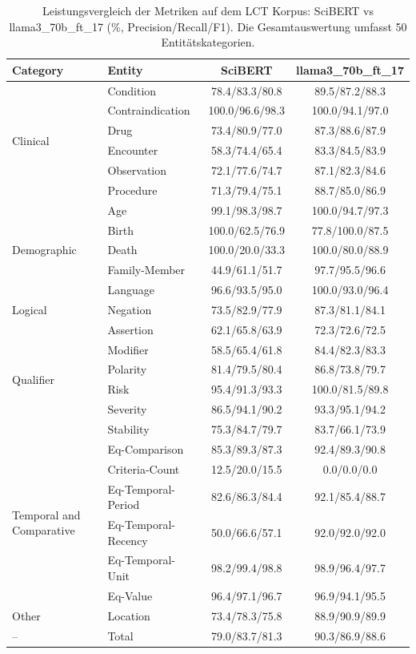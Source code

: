 
\begin{table}[htbp]
\centering
\begin{tabular}{llcc}
\toprule
\textbf{Category} & \textbf{Entity} & \textbf{SciBERT} & \textbf{llama3_70b_ft_17} \\
\midrule
\multirow{6}{*}{Clinical} & Condition & 78.4/83.3/80.8 & 89.5/87.2/88.3 \\
 & Contraindication & 100.0/96.6/98.3 & 100.0/94.1/97.0 \\
 & Drug & 73.4/80.9/77.0 & 87.3/88.6/87.9 \\
 & Encounter & 58.3/74.4/65.4 & 83.3/84.5/83.9 \\
 & Observation & 72.1/77.6/74.7 & 87.1/82.3/84.6 \\
 & Procedure & 71.3/79.4/75.1 & 88.7/85.0/86.9 \\
\midrule
\multirow{5}{*}{Demographic} & Age & 99.1/98.3/98.7 & 100.0/94.7/97.3 \\
 & Birth & 100.0/62.5/76.9 & 77.8/100.0/87.5 \\
 & Death & 100.0/20.0/33.3 & 100.0/80.0/88.9 \\
 & Family-Member & 44.9/61.1/51.7 & 97.7/95.5/96.6 \\
 & Language & 96.6/93.5/95.0 & 100.0/93.0/96.4 \\
\midrule
Logical & Negation & 73.5/82.9/77.9 & 87.3/81.1/84.1 \\
\midrule
\multirow{6}{*}{Qualifier} & Assertion & 62.1/65.8/63.9 & 72.3/72.6/72.5 \\
 & Modifier & 58.5/65.4/61.8 & 84.4/82.3/83.3 \\
 & Polarity & 81.4/79.5/80.4 & 86.8/73.8/79.7 \\
 & Risk & 95.4/91.3/93.3 & 100.0/81.5/89.8 \\
 & Severity & 86.5/94.1/90.2 & 93.3/95.1/94.2 \\
 & Stability & 75.3/84.7/79.7 & 83.7/66.1/73.9 \\
\midrule
\multirow{6}{*}{Temporal and Comparative} & Eq-Comparison & 85.3/89.3/87.3 & 92.4/89.3/90.8 \\
 & Criteria-Count & 12.5/20.0/15.5 & 0.0/0.0/0.0 \\
 & Eq-Temporal-Period & 82.6/86.3/84.4 & 92.1/85.4/88.7 \\
 & Eq-Temporal-Recency & 50.0/66.6/57.1 & 92.0/92.0/92.0 \\
 & Eq-Temporal-Unit & 98.2/99.4/98.8 & 98.9/96.4/97.7 \\
 & Eq-Value & 96.4/97.1/96.7 & 96.9/94.1/95.5 \\
\midrule
Other & Location & 73.4/78.3/75.8 & 88.9/90.9/89.9 \\
\midrule
-- & Total & 79.0/83.7/81.3 & 90.3/86.9/88.6 \\
\bottomrule
\end{tabular}
\caption{Leistungsvergleich der Metriken auf dem LCT Korpus: SciBERT vs llama3_70b_ft_17 (\%, Precision/Recall/F1). Die Gesamtauswertung umfasst 50 Entitätskategorien.}
\label{tab:metrics_comparison}
\end{table}
    